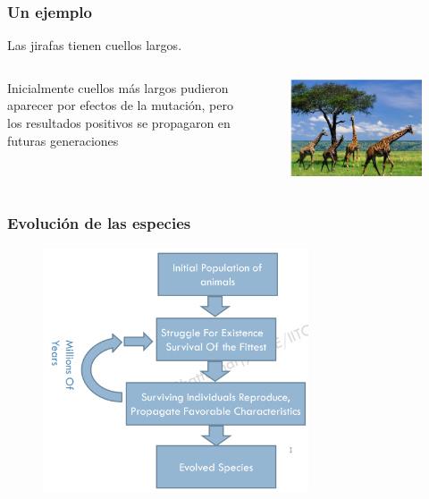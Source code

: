 \documentclass[10pt]{beamer}
\begin{document}
\begin{frame}
  \frametitle{Un ejemplo}
  Las jirafas tienen cuellos largos.
  \begin{columns}
    \begin{column}{0.6\textwidth}
        Inicialmente cuellos más largos pudieron aparecer por efectos 
        de la mutación, pero los resultados positivos se propagaron 
        en futuras generaciones
    \end{column}
    \begin{column}{0.4\textwidth}
      \begin{figure}[!h] 
        \centering
        \includegraphics[width=1\textwidth]{img/jirafa2}
      \end{figure}  
    \end{column}
  \end{columns}
\end{frame}

\begin{frame}
  \frametitle{Evolución de las especies}
  \begin{figure}[!h] 
    \centering
    \includegraphics[width=0.7\textwidth]{img/evo2}
  \end{figure}
\end{frame}
\end{document}
